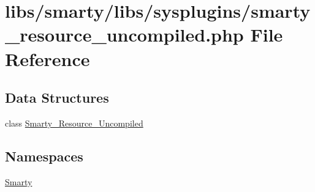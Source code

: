 \hypertarget{smarty__resource__uncompiled_8php}{}\section{libs/smarty/libs/sysplugins/smarty\+\_\+resource\+\_\+uncompiled.php File Reference}
\label{smarty__resource__uncompiled_8php}
\subsection*{Data Structures}
\begin{DoxyCompactItemize}
\item 
class \hyperlink{class_smarty___resource___uncompiled}{Smarty\+\_\+\+Resource\+\_\+\+Uncompiled}
\end{DoxyCompactItemize}
\subsection*{Namespaces}
\begin{DoxyCompactItemize}
\item 
 \hyperlink{namespace_smarty}{Smarty}
\end{DoxyCompactItemize}
